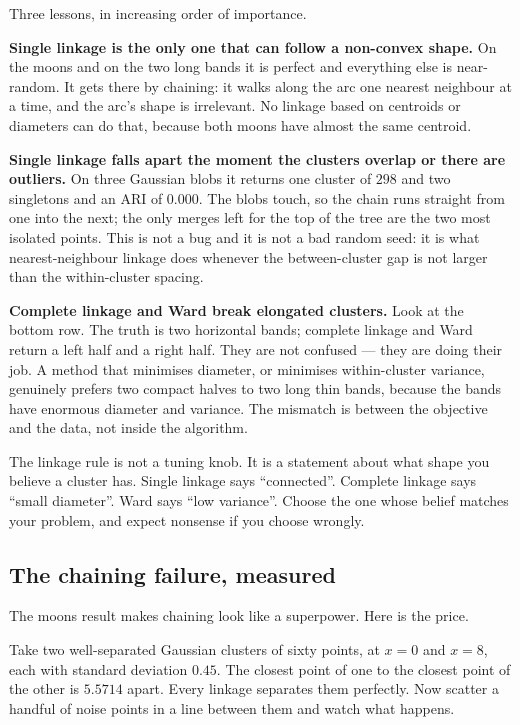 \documentclass[11pt]{article}
\begin{document}
Three lessons, in increasing order of importance.

\textbf{Single linkage is the only one that can follow a non-convex shape.}
On the moons and on the two long bands it is perfect and everything else is
near-random. It gets there by chaining: it walks along the arc one nearest
neighbour at a time, and the arc's shape is irrelevant. No linkage based on
centroids or diameters can do that, because both moons have almost the same
centroid.

\textbf{Single linkage falls apart the moment the clusters overlap or there
are outliers.} On three Gaussian blobs it returns one cluster of $298$ and two
singletons and an ARI of $0.000$. The blobs touch, so the chain runs straight
from one into the next; the only merges left for the top of the tree are the
two most isolated points. This is not a bug and it is not a bad random seed:
it is what nearest-neighbour linkage does whenever the between-cluster gap is
not larger than the within-cluster spacing.

\textbf{Complete linkage and Ward break elongated clusters.} Look at the
bottom row. The truth is two horizontal bands; complete linkage and Ward
return a left half and a right half. They are not confused --- they are doing
their job. A method that minimises diameter, or minimises within-cluster
variance, genuinely prefers two compact halves to two long thin bands, because
the bands have enormous diameter and variance. The mismatch is between the
objective and the data, not inside the algorithm.

\begin{keyidea}
The linkage rule is not a tuning knob. It is a statement about what shape you
believe a cluster has. Single linkage says ``connected''. Complete linkage
says ``small diameter''. Ward says ``low variance''. Choose the one whose
belief matches your problem, and expect nonsense if you choose wrongly.
\end{keyidea}

\subsection{The chaining failure, measured}

The moons result makes chaining look like a superpower. Here is the price.

Take two well-separated Gaussian clusters of sixty points, at $x = 0$ and
$x = 8$, each with standard deviation $0.45$. The closest point of one to the
closest point of the other is $5.5714$ apart. Every linkage separates them
perfectly. Now scatter a handful of noise points in a line between them and
watch what happens.
\end{document}
